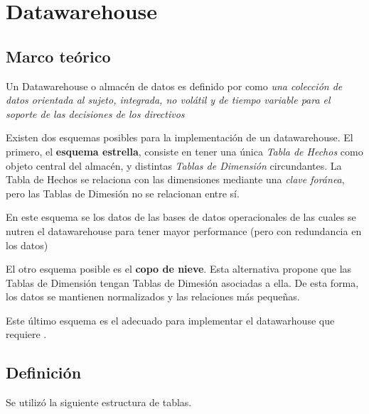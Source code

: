 \section{Datawarehouse}

\subsection{Marco teórico}

Un Datawarehouse o almacén de datos es definido por \autocite{elmasri-dw} como \emph{una colección de datos orientada al sujeto, integrada, no volátil y de tiempo variable para el soporte de las decisiones de los directivos} 

Existen dos esquemas posibles para la implementación de un datawarehouse. El primero, el \textbf{esquema estrella}, consiste en tener una única \emph{Tabla de Hechos} como objeto central del almacén, y distintas \emph{Tablas de Dimensión} circundantes. La Tabla de Hechos se relaciona con las dimensiones mediante una \emph{clave foránea}, pero las Tablas de Dimesión no se relacionan entre sí.

En este esquema se  los datos de las bases de datos operacionales de las cuales se nutren el datawarehouse para tener mayor performance (pero con redundancia en los datos)

El otro esquema posible es el \textbf{copo de nieve}. Esta alternativa propone que las Tablas de Dimensión tengan Tablas de Dimesión asociadas a ella. De esta forma, los datos se mantienen normalizados y las relaciones más pequeñas.

Este último esquema es el adecuado para implementar el datawarhouse que requiere .

\subsection{Definición}

Se utilizó la siguiente estructura de tablas.

